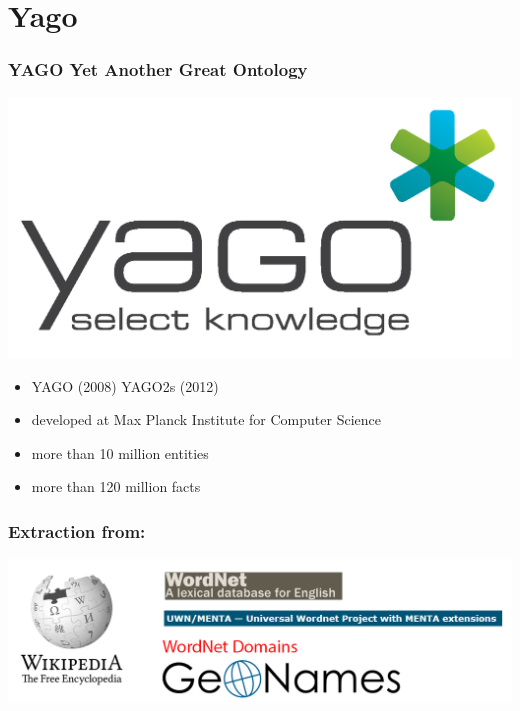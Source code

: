

\section{Yago}
\begin{frame}
\frametitle{YAGO Yet Another Great Ontology}
\includegraphics[scale=0.25]{img/yago_logo_small.png}
\begin{itemize}
\item YAGO (2008) YAGO2s (2012)
\item developed at Max Planck Institute for Computer Science
\item more than 10 million entities
\item more than 120 million facts
\end{itemize}
\end{frame}

\begin{frame}
\frametitle{Extraction from:}
\includegraphics[scale=0.31]{img/yago-figure2.png}
\end{frame}

